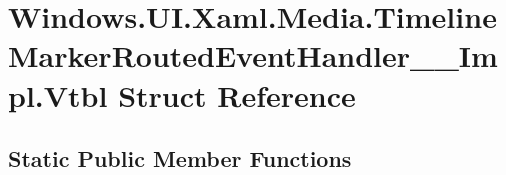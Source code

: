 \hypertarget{struct_windows_1_1_u_i_1_1_xaml_1_1_media_1_1_timeline_marker_routed_event_handler_____impl_1_1_vtbl}{}\section{Windows.\+U\+I.\+Xaml.\+Media.\+Timeline\+Marker\+Routed\+Event\+Handler\+\_\+\+\_\+\+Impl.\+Vtbl Struct Reference}
\label{struct_windows_1_1_u_i_1_1_xaml_1_1_media_1_1_timeline_marker_routed_event_handler_____impl_1_1_vtbl}
\subsection*{Static Public Member Functions}
